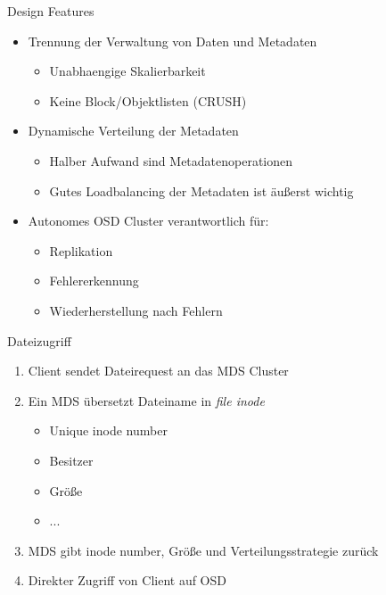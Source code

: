\documentclass[notes=hide,yellow]{beamer}
\begin{document}
\begin{frame}{Design Features}
	\begin{itemize}
		\item Trennung der Verwaltung von Daten und Metadaten
		\begin{itemize}
			\item Unabhaengige Skalierbarkeit
			\item Keine Block/Objektlisten (CRUSH)
		\end{itemize}
		\item  Dynamische Verteilung der Metadaten
		\begin{itemize}
			\item Halber Aufwand sind Metadatenoperationen
			\item Gutes Loadbalancing der Metadaten ist \"außerst wichtig %
		\end{itemize}
		\item Autonomes OSD Cluster verantwortlich f\"ur:
			\begin{itemize}
				\item Replikation
				\item Fehlererkennung
				\item Wiederherstellung nach Fehlern
			\end{itemize}
	\end{itemize}	
\end{frame}

\begin{frame}{Dateizugriff}

\begin{enumerate}
	\item Client sendet Dateirequest an das MDS Cluster
	\item Ein MDS \"ubersetzt Dateiname in \textit{file inode}
	\begin{itemize}
		\item Unique inode number
		\item Besitzer
		\item Gr\"oße
		\item ...
	\end{itemize}
	\item MDS gibt inode number, Gr\"oße und Verteilungsstrategie zur\"uck
	\item Direkter Zugriff von Client auf OSD
\end{enumerate}
\end{frame}
\end{document}
